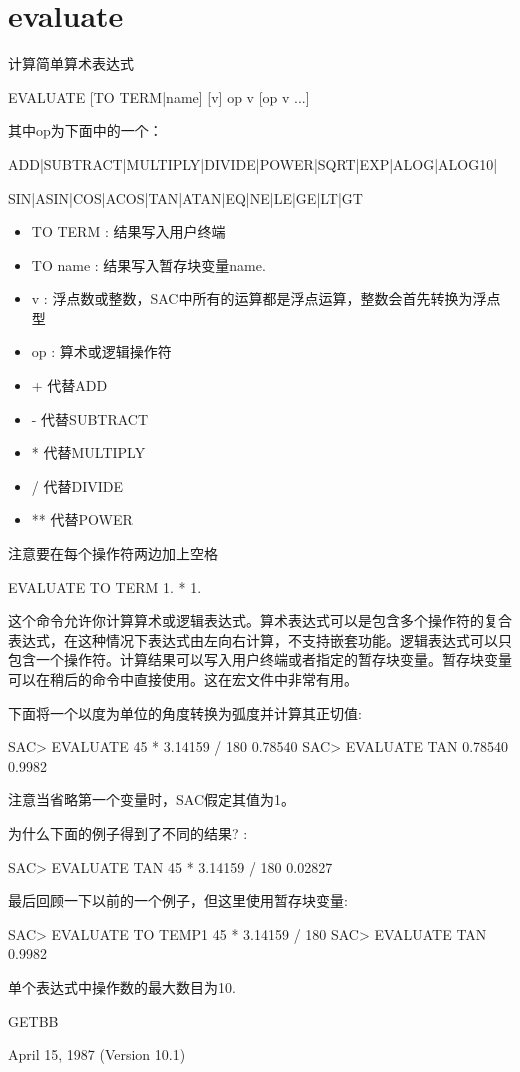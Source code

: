 \section{evaluate}
\label{cmd:evaluate}

计算简单算术表达式

EVALUATE [TO TERM|name] [v] op v [op v ...]

其中op为下面中的一个：

ADD|SUBTRACT|MULTIPLY|DIVIDE|POWER|SQRT|EXP|ALOG|ALOG10|

SIN|ASIN|COS|ACOS|TAN|ATAN|EQ|NE|LE|GE|LT|GT

\begin{itemize}
\item TO TERM : 结果写入用户终端
\item TO name : 结果写入暂存块变量name.
\item v : 浮点数或整数，SAC中所有的运算都是浮点运算，整数会首先转换为浮点型
\item op : 算术或逻辑操作符
\end{itemize}

\begin{itemize}
\item + 代替ADD
\item - 代替SUBTRACT
\item * 代替MULTIPLY
\item / 代替DIVIDE
\item ** 代替POWER
\end{itemize}
注意要在每个操作符两边加上空格


EVALUATE TO TERM 1. * 1.

这个命令允许你计算算术或逻辑表达式。算术表达式可以是包含多个操作符的复合表达式，在这种情况下表达式由左向右计算，不支持嵌套功能。逻辑表达式可以只包含一个操作符。计算结果可以写入用户终端或者指定的暂存块变量。暂存块变量可以在稍后的命令中直接使用。这在宏文件中非常有用。

下面将一个以度为单位的角度转换为弧度并计算其正切值:
\begin{SACCode}
SAC> EVALUATE 45 * 3.14159 / 180
 0.78540
SAC> EVALUATE TAN 0.78540
 0.9982
\end{SACCode}
注意当省略第一个变量时，SAC假定其值为1。

为什么下面的例子得到了不同的结果? :
\begin{SACCode}
SAC> EVALUATE TAN 45 * 3.14159 / 180
 0.02827
\end{SACCode}
最后回顾一下以前的一个例子，但这里使用暂存块变量:
\begin{SACCode}
SAC> EVALUATE TO TEMP1 45 * 3.14159 / 180
SAC> EVALUATE TAN %
 0.9982
\end{SACCode}

单个表达式中操作数的最大数目为10.

GETBB

April 15, 1987 (Version 10.1)
